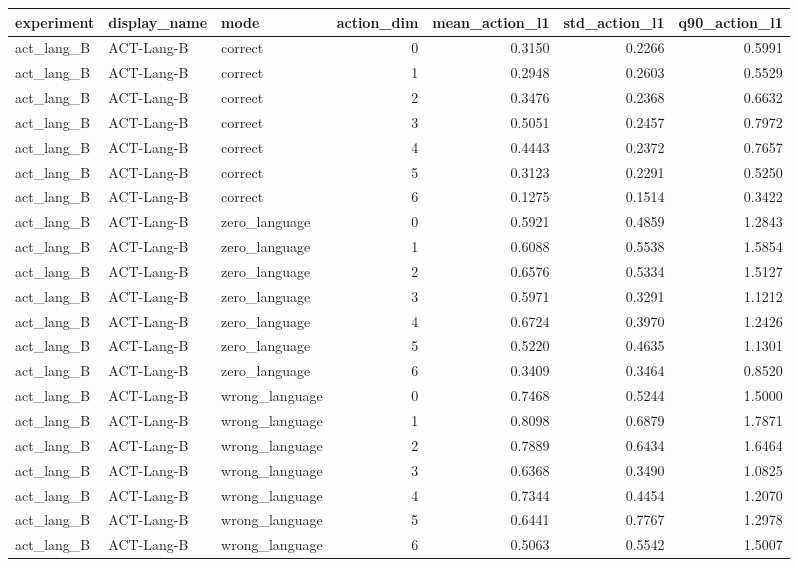 \begin{tabular}{lllrrrr}
\toprule
experiment & display\_name & mode & action\_dim & mean\_action\_l1 & std\_action\_l1 & q90\_action\_l1 \\
\midrule
act\_lang\_B & ACT-Lang-B & correct & 0 & 0.3150 & 0.2266 & 0.5991 \\
act\_lang\_B & ACT-Lang-B & correct & 1 & 0.2948 & 0.2603 & 0.5529 \\
act\_lang\_B & ACT-Lang-B & correct & 2 & 0.3476 & 0.2368 & 0.6632 \\
act\_lang\_B & ACT-Lang-B & correct & 3 & 0.5051 & 0.2457 & 0.7972 \\
act\_lang\_B & ACT-Lang-B & correct & 4 & 0.4443 & 0.2372 & 0.7657 \\
act\_lang\_B & ACT-Lang-B & correct & 5 & 0.3123 & 0.2291 & 0.5250 \\
act\_lang\_B & ACT-Lang-B & correct & 6 & 0.1275 & 0.1514 & 0.3422 \\
act\_lang\_B & ACT-Lang-B & zero\_language & 0 & 0.5921 & 0.4859 & 1.2843 \\
act\_lang\_B & ACT-Lang-B & zero\_language & 1 & 0.6088 & 0.5538 & 1.5854 \\
act\_lang\_B & ACT-Lang-B & zero\_language & 2 & 0.6576 & 0.5334 & 1.5127 \\
act\_lang\_B & ACT-Lang-B & zero\_language & 3 & 0.5971 & 0.3291 & 1.1212 \\
act\_lang\_B & ACT-Lang-B & zero\_language & 4 & 0.6724 & 0.3970 & 1.2426 \\
act\_lang\_B & ACT-Lang-B & zero\_language & 5 & 0.5220 & 0.4635 & 1.1301 \\
act\_lang\_B & ACT-Lang-B & zero\_language & 6 & 0.3409 & 0.3464 & 0.8520 \\
act\_lang\_B & ACT-Lang-B & wrong\_language & 0 & 0.7468 & 0.5244 & 1.5000 \\
act\_lang\_B & ACT-Lang-B & wrong\_language & 1 & 0.8098 & 0.6879 & 1.7871 \\
act\_lang\_B & ACT-Lang-B & wrong\_language & 2 & 0.7889 & 0.6434 & 1.6464 \\
act\_lang\_B & ACT-Lang-B & wrong\_language & 3 & 0.6368 & 0.3490 & 1.0825 \\
act\_lang\_B & ACT-Lang-B & wrong\_language & 4 & 0.7344 & 0.4454 & 1.2070 \\
act\_lang\_B & ACT-Lang-B & wrong\_language & 5 & 0.6441 & 0.7767 & 1.2978 \\
act\_lang\_B & ACT-Lang-B & wrong\_language & 6 & 0.5063 & 0.5542 & 1.5007 \\

\end{tabular}
